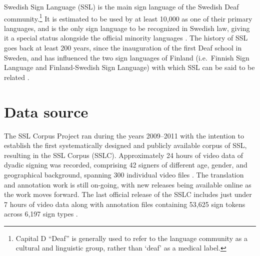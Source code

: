 \documentclass[11pt]{article}
\begin{document}
Swedish Sign Language (SSL) is the main sign language of the Swedish Deaf community.\footnote{Capital D ``Deaf'' is generally used to refer to the language community as a cultural and linguistic group, rather than `deaf' as a medical label.} It is estimated to be used by at least 10,000 as one of their primary languages, and is the only sign language to be recognized in Swedish law, giving it a special status alongside the official minority languages \cite{Ahlgren2006sou,Parkvall2015siffror}. The history of SSL goes back at least 200 years, since the inauguration of the first Deaf school in Sweden, and has influenced the two sign languages of Finland (i.e.~Finnish Sign Language and Finland-Swedish Sign Language) with which SSL can be said to be related \cite{Bergman2010transmission}.

\section{Data source}

The SSL Corpus Project ran during the years 2009--2011 with the intention to establish the first systematically designed and publicly available corpus of SSL, resulting in the SSL Corpus (SSLC). Approximately 24 hours of video data of dyadic signing was recorded, comprising 42 signers of different age, gender, and geographical background, spanning 300 individual video files \cite{Mesch2012signed}. The translation and annotation work is still on-going, with new releases being available online as the work moves forward. The last official release of the SSLC includes just under 7 hours of video data \cite{Mesch2012dataset} along with annotation files containing 53,625 sign tokens across 6,197 sign types \cite{Mesch2016annotated}. 
\end{document}
